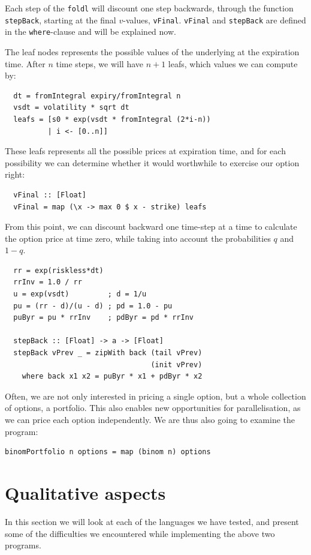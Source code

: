 \documentclass[preprint]{sigplanconf}
\begin{document}
Each step of the \verb|foldl| will discount one step backwards,
through the function \verb|stepBack|, starting at the final
$v$-values, \verb|vFinal|. \verb|vFinal| and \verb|stepBack| are
defined in the \verb|where|-clause and will be explained now.

The leaf nodes represents the possible values of the underlying at
the expiration time. After $n$ time steps, we will have $n+1$ leafs, which
values we can compute by:
\begin{verbatim}
  dt = fromIntegral expiry/fromIntegral n
  vsdt = volatility * sqrt dt
  leafs = [s0 * exp(vsdt * fromIntegral (2*i-n))
          | i <- [0..n]]
\end{verbatim}
These leafs represents all the possible prices at expiration time, and
for each possibility we can determine whether it would worthwhile to
exercise our option right:
\begin{verbatim}
  vFinal :: [Float]
  vFinal = map (\x -> max 0 $ x - strike) leafs
\end{verbatim}
From this point, we can discount backward one time-step at a time to
calculate the option price at time zero, while taking into account the
probabilities $q$ and $1-q$.
\begin{verbatim}
  rr = exp(riskless*dt)
  rrInv = 1.0 / rr
  u = exp(vsdt)         ; d = 1/u
  pu = (rr - d)/(u - d) ; pd = 1.0 - pu
  puByr = pu * rrInv    ; pdByr = pd * rrInv

  stepBack :: [Float] -> a -> [Float]
  stepBack vPrev _ = zipWith back (tail vPrev)
                                  (init vPrev)
    where back x1 x2 = puByr * x1 + pdByr * x2
\end{verbatim}

Often, we are not only interested in pricing a single option, but a
whole collection of options, a portfolio. This also enables new
opportunities for parallelisation, as we can price each option
independently. We are thus also going to examine the program:

\begin{verbatim}
binomPortfolio n options = map (binom n) options
\end{verbatim}

\section{Qualitative aspects}
In this section we will look at each of the languages we have tested,
and present some of the difficulties we encountered while implementing
the above two programs.
\end{document}
